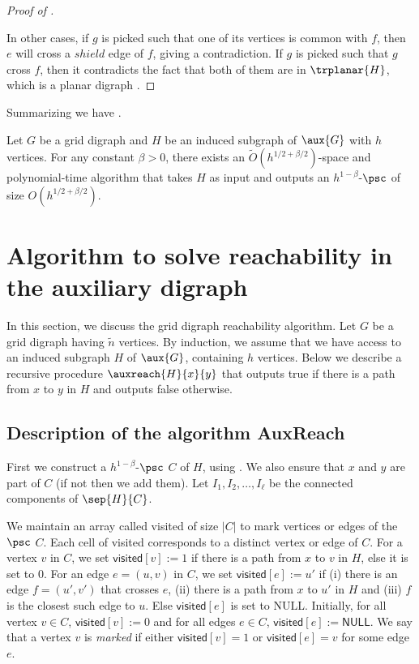 \documentclass{toc}
\begin{document}
\begin{proof}[Proof of ]
\begin{description}
\begin{description}
\end{description}
\end{description}
In other cases, if $g$ is picked such that one of its vertices is common with $f$, then $e$ will cross a $shield$ edge of $f$, giving a contradiction. If $g$ is picked such that $g$ cross $f$, then it contradicts the fact that both of them are %
 in $\trplanar{H}$, which is a planar %
digraph %
.
\end{proof}
Summarizing   we have .
\begin{theorem} \label{thm:constructpsc}
Let $G$ be a grid %
digraph %
 and $H$ be %
an%
induced subgraph of $\aux{G}$ with $h$ vertices. For any constant $\beta > 0$, there exists an $\tilde{O}(h^{1/2 + \beta/2})$-space and polynomial-time %
algorithm that takes $H$ as input and outputs an $h^{1-\beta}$-$\psc$ of size $O(h^{1/2 + \beta/2})$.
\end{theorem}

%
\section{Algorithm to solve reachability in the auxiliary %
digraph %
}   %
\label{sec:auxreach}

In this section, we discuss the grid %
digraph %
 reachability algorithm. Let $G$ be a grid %
digraph %
 having $\widetilde{n}$ vertices. By induction, we assume that we have access to %
an %
induced subgraph $H$ of $\aux{G}$, containing $h$ vertices. Below we describe a recursive procedure $\auxreach{H}{x}{y}$ that outputs \textsf{true} if there is a path from $x$ to $y$ in $H$ and outputs \textsf{false} otherwise.

\subsection{Description of the algorithm \textsf{AuxReach}}

First we construct a $h^{1-\beta}$-$\psc$ $C$ of $H$, using . We also ensure that $x$ and $y$ are part of $C$ (if not then we add them). Let $I_1, I_2, \ldots, I_{\ell}$ be the connected components of $\sep{H}{C}$.

We maintain an array called \textsf{visited} of size $|C|$ to mark vertices or edges of the $\psc$ $C$. Each cell of \textsf{visited} corresponds to a distinct vertex or edge of $C$. For a vertex $v$ in $C$, we set $\textsf{visited}[v] := 1$ if there is a path from $x$ to $v$ in $H$, else it is set to 0. For an edge $e = (u,v)$ in $C$, we set $\textsf{visited}[e] := u'$ if (i) there is an edge $f = (u',v')$ that crosses $e$, (ii) there is a path from $x$ to $u'$ in $H$ and (iii) $f$ is the closest such edge to $u$. Else $\textsf{visited}[e]$ is set to \textsf{NULL}. Initially, for all vertex $v \in C$, $\textsf{visited}[v] := 0$ and for all edges $e \in C$, $\textsf{visited}[e] := \textsf{NULL}$. We say that a vertex $v$ is \emph{marked} if either $\textsf{visited}[v] = 1$ or $\textsf{visited}[e] = v$ for some edge $e$.
\end{document}
